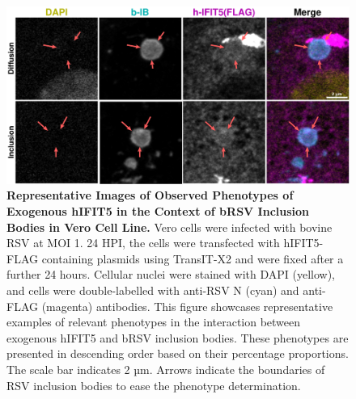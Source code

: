 \begin{figure}
    \centering
    \includegraphics[width=1\linewidth]{09. Chapter 4/Figs/02. Overexpression/04. IFIT5/06. i5-brsv.pdf}
    \caption[Representative Images of Observed Phenotypes of Exogenous hIFIT5 in the Context of bRSV Inclusion Bodies in Vero Cell Line.]{\textbf{Representative Images of Observed Phenotypes of Exogenous hIFIT5 in the Context of bRSV Inclusion Bodies in Vero Cell Line.} Vero cells were infected with bovine RSV at MOI 1. 24 HPI, the cells were transfected with hIFIT5-FLAG containing plasmids using TransIT-X2 and were fixed after a further 24 hours. Cellular nuclei were stained with DAPI (yellow), and cells were double-labelled with anti-RSV N (cyan) and anti-FLAG (magenta) antibodies. This figure showcases representative examples of relevant phenotypes in the interaction between exogenous hIFIT5 and bRSV inclusion bodies. These phenotypes are presented in descending order based on their percentage proportions. The scale bar indicates 2 µm. Arrows indicate the boundaries of RSV inclusion bodies to ease the phenotype determination.}
    \label{fig:Representative Images of Observed Phenotypes of Exogenous hIFIT5 in the Context of bRSV Inclusion Bodies in VERO Cell Line}
\end{figure}


